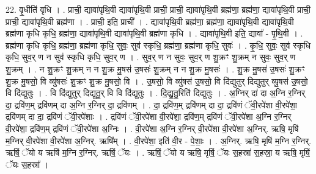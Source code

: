 \documentclass[17pt]{extarticle}
\begin{document}
22. वृ॒धीति॑ वृधि । . प्राची॒ द्यावा॑पृथि॒वी द्यावा॑पृथि॒वी प्राची॒ प्राची॒ द्यावा॑पृथि॒वी ब्रह्म॑णा॒ ब्रह्म॑णा॒ द्यावा॑पृथि॒वी प्राची॒ प्राची॒ द्यावा॑पृथि॒वी ब्रह्म॑णा । . प्राची॒ इति॒ प्राची᳚ । . द्यावा॑पृथि॒वी ब्रह्म॑णा॒ ब्रह्म॑णा॒ द्यावा॑पृथि॒वी द्यावा॑पृथि॒वी ब्रह्म॑णा कृधि कृधि॒ ब्रह्म॑णा॒ द्यावा॑पृथि॒वी द्यावा॑पृथि॒वी ब्रह्म॑णा कृधि । . द्यावा॑पृथि॒वी इति॒ द्यावा᳚ - पृ॒थि॒वी । . ब्रह्म॑णा कृधि कृधि॒ ब्रह्म॑णा॒ ब्रह्म॑णा कृधि॒ सुवः॒ सुव॑ स्कृधि॒ ब्रह्म॑णा॒ ब्रह्म॑णा कृधि॒ सुवः॑ । . कृ॒धि॒ सुवः॒ सुव॑ स्कृधि कृधि॒ सुव॒र् ण न सुव॑ स्कृधि कृधि॒ सुव॒र् ण । . सुव॒र् ण न सुवः॒ सुव॒र् ण शु॒क्रꣳ शु॒क्रम् न सुवः॒ सुव॒र् ण शु॒क्रम् । . न शु॒क्रꣳ शु॒क्रम् न न शु॒क्र मु॒षस॑ उ॒षसः॑ शु॒क्रम् न न शु॒क्र मु॒षसः॑ । . शु॒क्र मु॒षस॑ उ॒षसः॑ शु॒क्रꣳ शु॒क्र मु॒षसो॒ वि व्यु॑षसः॑ शु॒क्रꣳ शु॒क्र मु॒षसो॒ वि । . उ॒षसो॒ वि व्यु॑षस॑ उ॒षसो॒ वि दि॑द्युतुर् दिद्युतुर् व्यु॒षस॑ उ॒षसो॒ वि दि॑द्युतुः । . वि दि॑द्युतुर् दिद्युतु॒र् वि वि दि॑द्युतुः । . दि॒द्यु॒तु॒रिति॑ दिद्युतुः । . अ॒ग्निर् दा॑ दा अ॒ग्नि र॒ग्निर् दा॒ द्रवि॑ण॒म् द्रवि॑णम् दा अ॒ग्नि र॒ग्निर् दा॒ द्रवि॑णम् । . दा॒ द्रवि॑ण॒म् द्रवि॑णम् दा दा॒ द्रवि॑णं ॅवी॒रपे॑शा वी॒रपे॑शा॒ द्रवि॑णम् दा दा॒ द्रवि॑णं ॅवी॒रपे॑शाः । . द्रवि॑णं ॅवी॒रपे॑शा वी॒रपे॑शा॒ द्रवि॑ण॒म् द्रवि॑णं ॅवी॒रपे॑शा अ॒ग्नि र॒ग्निर् वी॒रपे॑शा॒ द्रवि॑ण॒म् द्रवि॑णं ॅवी॒रपे॑शा अ॒ग्निः । . वी॒रपे॑शा अ॒ग्नि र॒ग्निर् वी॒रपे॑शा वी॒रपे॑शा अ॒ग्निर्. ऋषि॒ मृषि॑ म॒ग्निर् वी॒रपे॑शा वी॒रपे॑शा अ॒ग्निर्. ऋषि᳚म् । . वी॒रपे॑शा॒ इति॑ वी॒र - पे॒शाः॒ । . अ॒ग्निर्. ऋषि॒ मृषि॑ म॒ग्नि र॒ग्निर्. ऋषिं॒ ॅयो य ऋषि॑ म॒ग्नि र॒ग्निर्. ऋषिं॒ ॅयः । . ऋषिं॒ ॅयो य ऋषि॒ मृषिं॒ ॅयः स॒हस्रा॑ स॒हस्रा॒ य ऋषि॒ मृषिं॒ ॅयः स॒हस्रा᳚ । \newline
\end{document}
